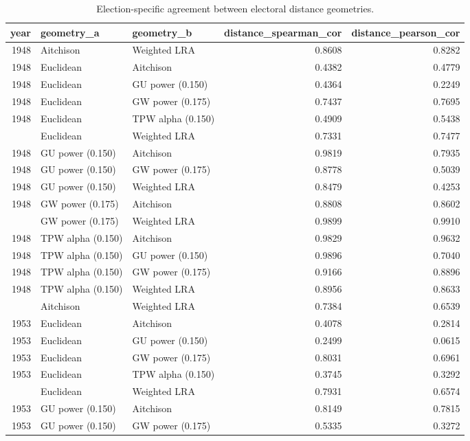 
\begin{longtable}[t]{rllrr}
\caption{\label{tab:app_geometry_agreement}Election-specific agreement between electoral distance geometries.}\\
\toprule
year & geometry\_a & geometry\_b & distance\_spearman\_cor & distance\_pearson\_cor\\
\midrule
1948 & Aitchison & Weighted LRA & 0.8608 & 0.8282\\
1948 & Euclidean & Aitchison & 0.4382 & 0.4779\\
1948 & Euclidean & GU power (0.150) & 0.4364 & 0.2249\\
1948 & Euclidean & GW power (0.175) & 0.7437 & 0.7695\\
1948 & Euclidean & TPW alpha (0.150) & 0.4909 & 0.5438\\
\addlinespace
1948 & Euclidean & Weighted LRA & 0.7331 & 0.7477\\
1948 & GU power (0.150) & Aitchison & 0.9819 & 0.7935\\
1948 & GU power (0.150) & GW power (0.175) & 0.8778 & 0.5039\\
1948 & GU power (0.150) & Weighted LRA & 0.8479 & 0.4253\\
1948 & GW power (0.175) & Aitchison & 0.8808 & 0.8602\\
\addlinespace
1948 & GW power (0.175) & Weighted LRA & 0.9899 & 0.9910\\
1948 & TPW alpha (0.150) & Aitchison & 0.9829 & 0.9632\\
1948 & TPW alpha (0.150) & GU power (0.150) & 0.9896 & 0.7040\\
1948 & TPW alpha (0.150) & GW power (0.175) & 0.9166 & 0.8896\\
1948 & TPW alpha (0.150) & Weighted LRA & 0.8956 & 0.8633\\
\addlinespace
1953 & Aitchison & Weighted LRA & 0.7384 & 0.6539\\
1953 & Euclidean & Aitchison & 0.4078 & 0.2814\\
1953 & Euclidean & GU power (0.150) & 0.2499 & 0.0615\\
1953 & Euclidean & GW power (0.175) & 0.8031 & 0.6961\\
1953 & Euclidean & TPW alpha (0.150) & 0.3745 & 0.3292\\
\addlinespace
1953 & Euclidean & Weighted LRA & 0.7931 & 0.6574\\
1953 & GU power (0.150) & Aitchison & 0.8149 & 0.7815\\
1953 & GU power (0.150) & GW power (0.175) & 0.5335 & 0.3272\\

\end{longtable}
